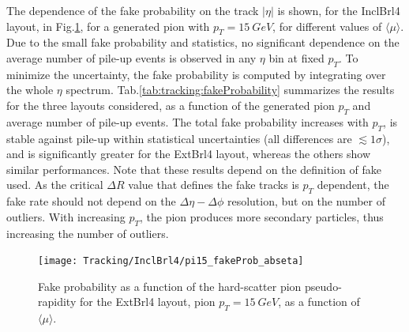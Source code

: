 \documentclass[a4paper,twoside,12pt]{book}
\begin{document}
The dependence of the fake probability on the track $|\eta|$ is shown, for the InclBrl4 layout, in Fig.\ref{fig:tracking:fakeProbability}, for a generated pion with $p_{T} = 15\ GeV$, for 
different values of $\langle\mu\rangle$. Due to the small fake probability and statistics, no significant dependence on the average number of pile-up events is observed in any $\eta$ bin at fixed $p_{T}$. To minimize
the uncertainty, the fake probability is computed by integrating over the whole $\eta$ spectrum. Tab.\ref{tab:tracking:fakeProbability} summarizes the results for the three layouts considered, as a function of the generated pion $p_{T}$ and average number of pile-up events. The total fake probability increases with $p_{T}$, is stable against pile-up within
statistical uncertainties (all differences are $\lesssim 1 \sigma$), and is significantly
greater for the ExtBrl4 layout, whereas the others show similar performances. Note that 
these results depend on the definition of fake used. As the critical $\Delta R$ value that defines
the fake tracks is $p_{T}$ dependent, the fake rate should not depend on the $\Delta\eta-\Delta\phi$ resolution, but on the number of outliers. With increasing $p_{T}$, 
the pion produces more secondary particles, thus increasing the number of outliers.\\ 

\begin{figure}
\centering
\texttt{[image: Tracking/InclBrl4/pi15\_fakeProb\_abseta]}
\caption{Fake probability as a function of the hard-scatter pion pseudo-rapidity for the ExtBrl4 layout, pion $p_{T} = 15\ GeV$, as a function of $\langle\mu\rangle$.} 
\label{fig:tracking:fakeProbability}
\end{figure}
\end{document}
